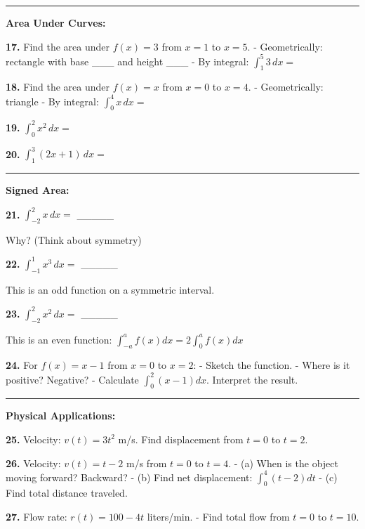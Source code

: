 \documentclass[
  11pt,
]{article}
\begin{document}
\begin{center}\rule{0.5\linewidth}{0.5pt}\end{center}

\textbf{Area Under Curves:}

\textbf{17.} Find the area under \(f(x) = 3\) from \(x = 1\) to
\(x = 5\). - Geometrically: rectangle with base \_\_\_ and height \_\_\_
- By integral: \(\int_1^5 3 \, dx ={}\)

\textbf{18.} Find the area under \(f(x) = x\) from \(x = 0\) to
\(x = 4\). - Geometrically: triangle - By integral:
\(\int_0^4 x \, dx ={}\)

\textbf{19.} \(\int_0^2 x^2 \, dx ={}\)

\textbf{20.} \(\int_1^3 (2x + 1) \, dx ={}\)

\begin{center}\rule{0.5\linewidth}{0.5pt}\end{center}

\textbf{Signed Area:}

\textbf{21.} \(\int_{-2}^2 x \, dx ={}\) \_\_\_\_\_

Why? (Think about symmetry)

\textbf{22.} \(\int_{-1}^1 x^3 \, dx ={}\) \_\_\_\_\_

This is an odd function on a symmetric interval.

\textbf{23.} \(\int_{-2}^2 x^2 \, dx ={}\) \_\_\_\_\_

This is an even function: \(\int_{-a}^a f(x) dx = 2\int_0^a f(x) dx\)

\textbf{24.} For \(f(x) = x - 1\) from \(x = 0\) to \(x = 2\): - Sketch
the function. - Where is it positive? Negative? - Calculate
\(\int_0^2 (x - 1) dx\). Interpret the result.

\begin{center}\rule{0.5\linewidth}{0.5pt}\end{center}

\textbf{Physical Applications:}

\textbf{25.} Velocity: \(v(t) = 3t^2\) m/s. Find displacement from
\(t = 0\) to \(t = 2\).

\textbf{26.} Velocity: \(v(t) = t - 2\) m/s from \(t = 0\) to \(t = 4\).
- (a) When is the object moving forward? Backward? - (b) Find net
displacement: \(\int_0^4 (t - 2) dt\) - (c) Find total distance
traveled.

\textbf{27.} Flow rate: \(r(t) = 100 - 4t\) liters/min. - Find total
flow from \(t = 0\) to \(t = 10\).
\end{document}
